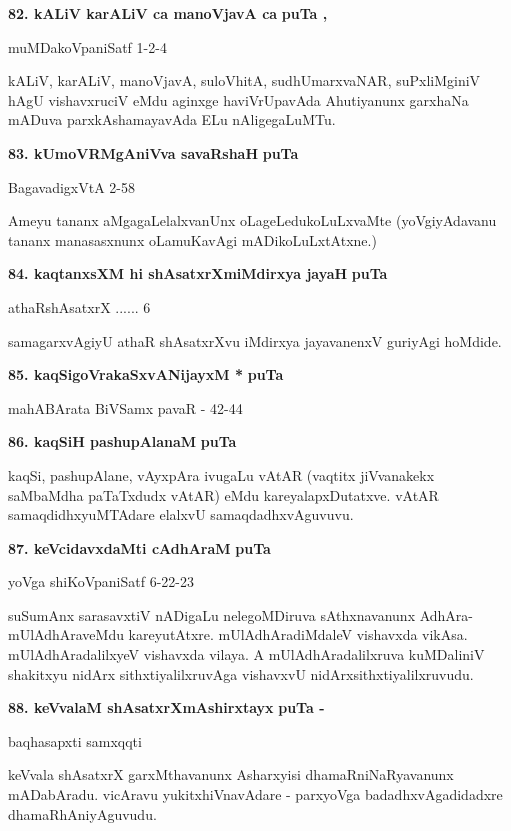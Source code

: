 \eject
\noindent
\textbf{82. kALiV karALiV ca manoVjavA ca} \hfill{\bf puTa \pageref{116}, \pageref{210b}}

\hfill{muMDakoVpaniSatf 1-2-4}

\smallskip
kALiV, karALiV, manoVjavA, suloVhitA, sudhUmarxvaNAR, suPxliMginiV hAgU vishavxruciV eMdu aginxge haviVrUpavAda Ahutiyanunx garxhaNa mADuva parxkAshamayavAda ELu nAligegaLuMTu.

\medskip
\noindent
\textbf{83. kUmoVRMgAniVva savaRshaH} \hfill{\bf puTa \pageref{73}}

\hfill{BagavadigxVtA 2-58}

\smallskip
Ameyu tananx aMgagaLelalxvanUnx oLageLedukoLuLxvaMte (yoVgiyAdavanu tananx manasasxnunx oLamuKavAgi mADikoLuLxtAtxne.)

\medskip
\noindent
\textbf{84. kaqtanxsXM hi shAsatxrXmiMdirxya jayaH} \hfill{\bf puTa \pageref{96}}

\hfill{athaRshAsatxrX ...... 6}

\smallskip
samagarxvAgiyU athaR shAsatxrXvu iMdirxya jayavanenxV guriyAgi hoMdide.

\medskip
\noindent
\textbf{85. kaqSigoVrakaSxvANijayxM *} \hfill{\bf puTa \pageref{91}}

\hfill{mahABArata BiVSamx pavaR - 42-44}

\medskip
\noindent
\textbf{86. kaqSiH pashupAlanaM} \hfill{\bf puTa \pageref{90a}}

\smallskip
kaqSi, pashupAlane, vAyxpAra ivugaLu vAtAR (vaqtitx jiVvanakekx saMbaMdha paTaTxdudx vAtAR) eMdu kareyalapxDutatxve. vAtAR samaqdidhxyuMTAdare elalxvU samaqdadhxvAguvuvu.

\medskip
\noindent
\textbf{87. keVcidavxdaMti cAdhAraM} \hfill{\bf puTa \pageref{82a}}

\hfill{yoVga shiKoVpaniSatf 6-22-23}

\smallskip
suSumAnx sarasavxtiV nADigaLu nelegoMDiruva sAthxnavanunx AdhAra-mUlAdhAraveMdu kareyutAtxre. mUlAdhAradiMdaleV vishavxda vikAsa. mUlAdhAradalilxyeV vishavxda vilaya. A mUlAdhAradalilxruva kuMDaliniV shakitxyu nidArx sithxtiyalilxruvAga vishavxvU nidArxsithxtiyalilxruvudu.

\medskip
\noindent
\textbf{88. keVvalaM shAsatxrXmAshirxtayx} \hfill{\bf puTa \pageref{64}-\pageref{164}}

\hfill{baqhasapxti samxqqti}

\smallskip
keVvala shAsatxrX garxMthavanunx Asharxyisi dhamaRniNaRyavanunx mADabAradu. vicAravu yukitxhiVnavAdare - parxyoVga badadhxvAgadidadxre dhamaRhAniyAguvudu.


